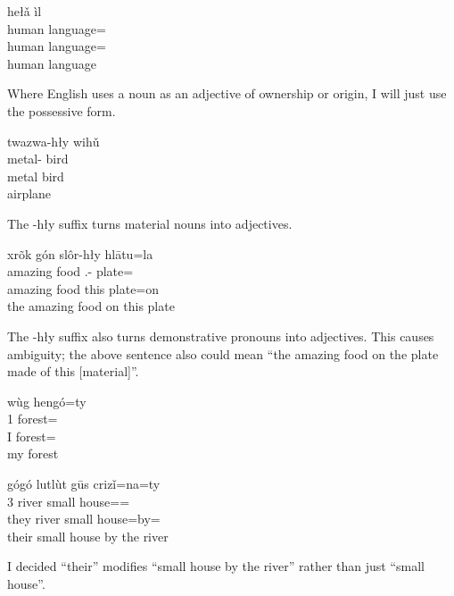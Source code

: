 \documentclass[12pt]{article}
\begin{document}
    \begin{exe}
        \ex
        \glll
        hełǎ ìl \\
        human language=\Poss{} \\
        human language=\Poss{} \\
        \glt
        human language
    \end{exe}
    Where English uses a noun as an adjective of ownership or origin,
    I will just use the possessive form.

    \begin{exe}
        \ex
        \glll
        twazwa-hły wihǔ \\
        metal-\Adj{} bird \\
        metal bird \\
        \glt
        airplane
    \end{exe}
    The -hły suffix turns material nouns into adjectives.

    \begin{exe}
        \ex
        \glll
        xrõk gón slôr-hły hlātu=la \\
        amazing food \Dem{}.\Prox{}-\Adj{} plate=\AdessThree{} \\
        amazing food this plate=on \\
        \glt
        the amazing food on this plate
    \end{exe}
    The -hły suffix also turns demonstrative pronouns into adjectives.
    This causes ambiguity;
    the above sentence also could mean
    ``the amazing food on the plate made of this [material]''.

    \begin{exe}
        \ex
        \glll
        wùg hengó=ty \\
        1\Sg{} forest=\Poss{} \\
        I forest=\Poss{} \\
        \glt
        my forest
    \end{exe}

    \begin{exe}
        \ex
        \glll
        gógó lutlùt gūs crizǐ=na=ty \\
        3\Pl{} river small house=\AdessTwo{}=\Poss{}  \\
        they river small house=by=\Poss{} \\
        \glt
        their small house by the river
    \end{exe}
    I decided ``their'' modifies ``small house by the river'' rather than just ``small house''.
\end{document}
